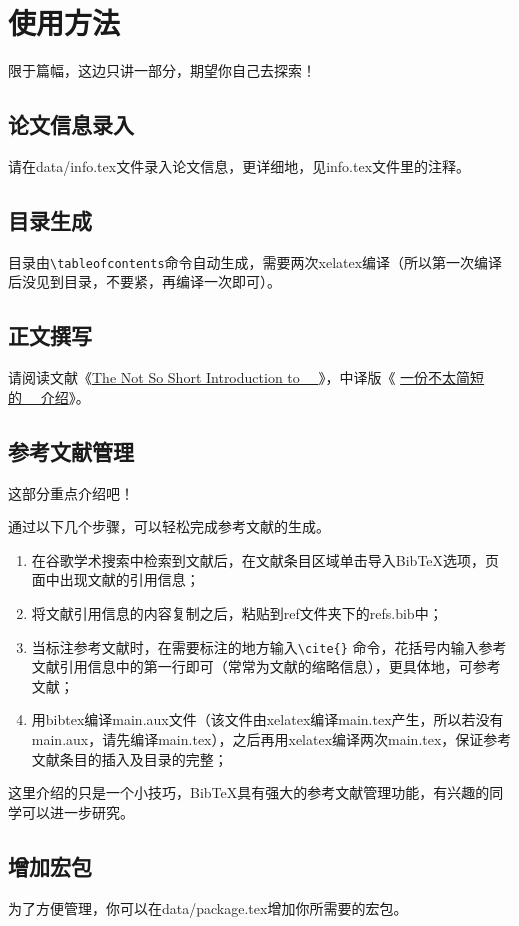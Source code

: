 \chapter{使用方法}
限于篇幅，这边只讲一部分，期望你自己去探索！
\section{论文信息录入}
请在data/info.tex文件录入论文信息，更详细地，见info.tex文件里的注释。
\section{目录生成}
目录由\verb|\tableofcontents|命令自动生成，需要两次xelatex编译（所以第一次编译后没见到目录，不要紧，再编译一次即可）。
\section{正文撰写}
请阅读文献《\href{http://mirrors.ustc.edu.cn/CTAN/info/lshort/english/lshort.pdf}{The Not So Short Introduction to ~\LaTeXe{}~}》，中译版《 \href{http://mirrors.hustunique.com/CTAN/info/lshort/chinese/lshort-zh-cn.pdf}{一份不太简短的~\LaTeXe{}~ 介绍}》。
\section{参考文献管理}
这部分重点介绍吧！\par
通过以下几个步骤，可以轻松完成参考文献的生成。\par
\begin{enumerate}
  \item 在谷歌学术搜索中检索到文献后，在文献条目区域单击导入BibTeX选项，页面中出现文献的引用信息；
  \item 将文献引用信息的内容复制之后，粘贴到ref文件夹下的refs.bib中；
  \item 当标注参考文献时，在需要标注的地方输入\verb|\cite{}| 命令，花括号内输入参考文献引用信息中的第一行即可（常常为文献的缩略信息），更具体地，可参考文献\cite{胡伟2011LaTeXe完全学习手册}；
  \item 用bibtex编译main.aux文件（该文件由xelatex编译main.tex产生，所以若没有main.aux，请先编译main.tex），之后再用xelatex编译两次main.tex，保证参考文献条目的插入及目录的完整；
\end{enumerate}
\par
这里介绍的只是一个小技巧，BibTeX具有强大的参考文献管理功能，有兴趣的同学可以进一步研究。
\section{增加宏包}
为了方便管理，你可以在data/package.tex增加你所需要的宏包。
